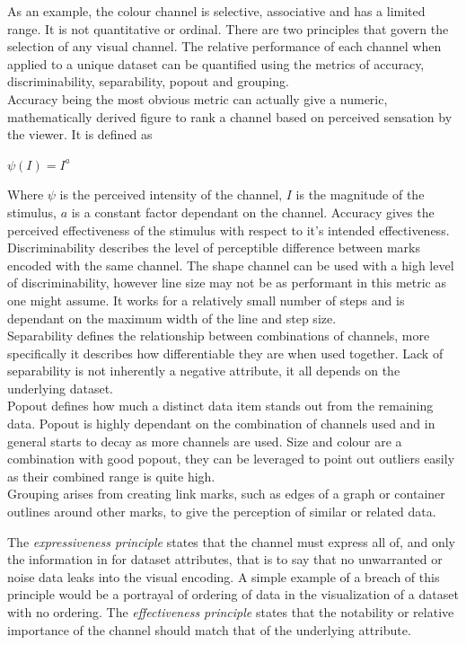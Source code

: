 \documentclass[12pt]{article}
\begin{document}
As an example, the colour channel is selective, associative and has a limited range. It is not quantitative or ordinal. There are two principles that govern the selection of any visual channel. The relative performance of each channel when applied to a unique dataset can be quantified using the metrics of accuracy, discriminability, separability, popout and grouping. \\

Accuracy being the most obvious metric can actually give a numeric, mathematically derived figure to rank a channel based on perceived sensation by the viewer. It is defined as
\begin{center}
	$\psi(I) = I^a$
\end{center}
Where $\psi$ is the perceived intensity of the channel, $I$ is the magnitude of the stimulus, $a$ is a constant factor dependant on the channel. Accuracy gives the perceived effectiveness of the stimulus with respect to it's intended effectiveness. \\

Discriminability describes the level of perceptible difference between marks encoded with the same channel. The shape channel can be used with a high level of discriminability, however line size may not be as performant in this metric as one might assume. It works for a relatively small number of steps and is dependant on the maximum width of the line and step size. \\

Separability defines the relationship between combinations of channels, more specifically it describes how differentiable they are when used together. Lack of separability is not inherently a negative attribute, it all depends on the underlying dataset. \\

Popout defines how much a distinct data item stands out from the remaining data. Popout is highly dependant on the combination of channels used and in general starts to decay as more channels are used. Size and colour are a combination with good popout, they can be leveraged to point out outliers easily as their combined range is quite high. \\

Grouping arises from creating link marks, such as edges of a graph or container outlines around other marks, to give the perception of similar or related data.

The \textit{expressiveness principle} states that the channel must express all of, and only the information in for dataset attributes, that is to say that no unwarranted or noise data leaks into the visual encoding. A simple example of a breach of this principle would be a portrayal of ordering of data in the visualization of a dataset with no ordering. The \textit{effectiveness principle} states that the notability or relative importance of the channel should match that of the underlying attribute.
\end{document}
